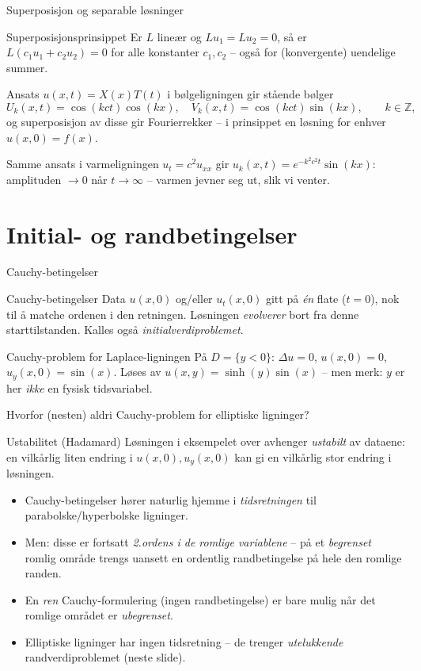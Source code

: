 \documentclass[11pt,aspectratio=169]{beamer}
\begin{document}
\begin{frame}{Superposisjon og separable løsninger}
\begin{oppsumb}{Superposisjonsprinsippet}
Er $L$ lineær og $Lu_1=Lu_2=0$, så er $L(c_1u_1+c_2u_2)=0$ for alle konstanter $c_1,c_2$ -- også for (konvergente) uendelige summer.
\end{oppsumb}
Ansats $u(x,t)=X(x)T(t)$ i bølgeligningen gir stående bølger
\[
U_k(x,t)=\cos(kct)\cos(kx), \quad V_k(x,t)=\cos(kct)\sin(kx), \qquad k\in\mathbb Z,
\]
og superposisjon av disse gir Fourierrekker -- i prinsippet en løsning for enhver $u(x,0)=f(x)$.

Samme ansats i varmeligningen $u_t=c^2u_{xx}$ gir $u_k(x,t)=e^{-k^2c^2t}\sin(kx)$: amplituden $\to0$ når $t\to\infty$ -- varmen jevner seg ut, slik vi venter.
\end{frame}

\section{Initial- og randbetingelser}

\begin{frame}{Cauchy-betingelser}
\begin{defnb}{Cauchy-betingelser}
Data $u(x,0)$ og/eller $u_t(x,0)$ gitt på \emph{én} flate ($t=0$), nok til å matche ordenen i den retningen. Løsningen \emph{evolverer} bort fra denne starttilstanden. Kalles også \emph{initialverdiproblemet}.
\end{defnb}
\begin{eksb}{Cauchy-problem for Laplace-ligningen}
På $D=\{y<0\}$: $\Delta u=0$, $u(x,0)=0$, $u_y(x,0)=\sin(x)$. Løses av $u(x,y)=\sinh(y)\sin(x)$ -- men merk: $y$ er her \emph{ikke} en fysisk tidsvariabel.
\end{eksb}
\end{frame}

\begin{frame}{Hvorfor (nesten) aldri Cauchy-problem for elliptiske ligninger?}
\begin{remb}{Ustabilitet (Hadamard)}
Løsningen i eksempelet over avhenger \emph{ustabilt} av dataene: en vilkårlig liten endring i $u(x,0),u_y(x,0)$ kan gi en vilkårlig stor endring i løsningen.
\end{remb}
\begin{itemize}
\item Cauchy-betingelser hører naturlig hjemme i \emph{tidsretningen} til parabolske/hyperbolske ligninger.
\item Men: disse er fortsatt \emph{2.ordens i de romlige variablene} -- på et \emph{begrenset} romlig område trengs uansett en ordentlig randbetingelse på hele den romlige randen.
\item En \emph{ren} Cauchy-formulering (ingen randbetingelse) er bare mulig når det romlige området er \emph{ubegrenset}.
\item Elliptiske ligninger har ingen tidsretning -- de trenger \emph{utelukkende} randverdiproblemet (neste slide).
\end{itemize}
\end{frame}
\end{document}
